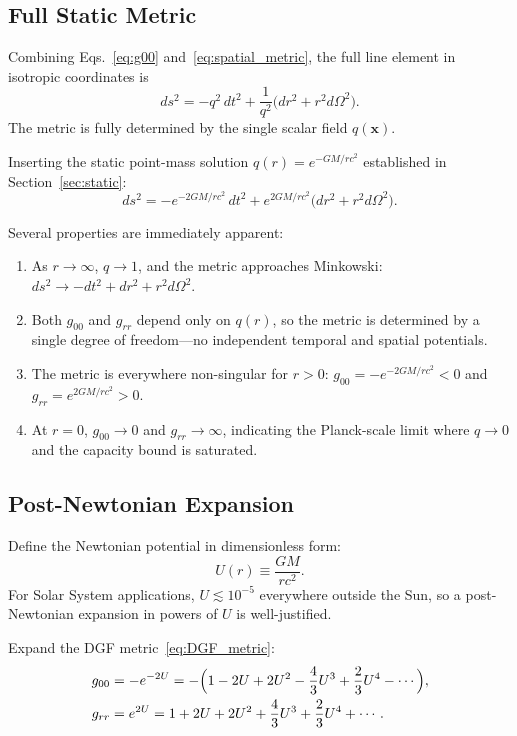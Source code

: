 \subsection{Full Static Metric}

Combining Eqs.~\eqref{eq:g00} and~\eqref{eq:spatial_metric}, the full line element in isotropic coordinates is
\begin{equation}
\boxed{ds^2 = -q^2\,dt^2 + \frac{1}{q^2}\bigl(dr^2 + r^2 d\Omega^2\bigr)}.
\label{eq:full_metric}
\end{equation}
The metric is fully determined by the single scalar field $q(\mathbf{x})$.

Inserting the static point-mass solution $q(r)=e^{-GM/rc^2}$ established in Section~\ref{sec:static}:
\begin{equation}
\boxed{ds^2 = -e^{-2GM/rc^2}\,dt^2 + e^{2GM/rc^2}\bigl(dr^2 + r^2 d\Omega^2\bigr)}.
\label{eq:DGF_metric}
\end{equation}

Several properties are immediately apparent:
\begin{enumerate}
    \item As $r\to\infty$, $q\to1$, and the metric approaches Minkowski: $ds^2\to -dt^2+dr^2+r^2d\Omega^2$.
    \item Both $g_{00}$ and $g_{rr}$ depend only on $q(r)$, so the metric is determined by a single degree of freedom---no independent temporal and spatial potentials.
    \item The metric is everywhere non-singular for $r>0$: $g_{00}=-e^{-2GM/rc^2}<0$ and $g_{rr}=e^{2GM/rc^2}>0$.
    \item At $r=0$, $g_{00}\to0$ and $g_{rr}\to\infty$, indicating the Planck-scale limit where $q\to0$ and the capacity bound is saturated.
\end{enumerate}

\subsection{Post-Newtonian Expansion}

Define the Newtonian potential in dimensionless form:
\begin{equation}
U(r) \equiv \frac{GM}{rc^2}.
\label{eq:Udef}
\end{equation}
For Solar System applications, $U\lesssim 10^{-5}$ everywhere outside the Sun, so a post-Newtonian expansion in powers of $U$ is well-justified.

Expand the DGF metric~\eqref{eq:DGF_metric}:
\begin{align}
g_{00} &= -e^{-2U} = -\Bigl(1 - 2U + 2U^2 - \frac{4}{3}U^3 + \frac{2}{3}U^4 - \cdots\Bigr), \label{eq:g00_expand} \\
g_{rr} &= e^{2U} = 1 + 2U + 2U^2 + \frac{4}{3}U^3 + \frac{2}{3}U^4 + \cdots. \label{eq:grr_expand}
\end{align}

